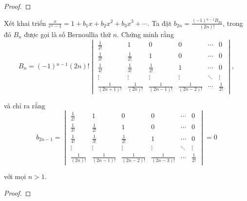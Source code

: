 \documentclass[class=linearalgebra,crop=false]{standalone}
\begin{document}
\begin{proof}
\end{proof}

\begin{exercise}
    \par Xét khai triển $\frac{x}{e^{x} - 1} = 1 + b_{1}x + b_{2}x^{2} + b_{3}x^{3} + \cdots$. Ta đặt $b_{2n} = \frac{(-1){}^{n-1}B_{2n}}{(2n)!}$, trong đó $B_{n}$ được gọi là số Bernoullia thứ $n$. Chứng minh rằng
    \[
        B_{n} = (-1){}^{n-1}(2n)!
        \begin{vmatrix}
            \frac{1}{2!}      & 1               & 0                 & 0                 & \cdots & 0            \\
            \frac{1}{3!}      & \frac{1}{2!}    & 1                 & 0                 & \cdots & 0            \\
            \frac{1}{4!}      & \frac{1}{3!}    & \frac{1}{2!}      & 1                 & \cdots & 0            \\
            \vdots            & \vdots          & \vdots            & \vdots            & \ddots & \vdots       \\
            \frac{1}{(2n+1)!} & \frac{1}{(2n)!} & \frac{1}{(2n-1)!} & \frac{1}{(2n-2)!} & \cdots & \frac{1}{2!}
        \end{vmatrix},
    \]
    \par và chỉ ra rằng
    \[
        b_{2n-1} =
        \begin{vmatrix}
            \frac{1}{2!}    & 1                 & 0                 & 0                 & \cdots & 0            \\
            \frac{1}{3!}    & \frac{1}{2!}      & 1                 & 0                 & \cdots & 0            \\
            \frac{1}{4!}    & \frac{1}{3!}      & \frac{1}{2!}      & 1                 & \cdots & 0            \\
            \vdots          & \vdots            & \vdots            & \vdots            & \ddots & \vdots       \\
            \frac{1}{(2n)!} & \frac{1}{(2n-1)!} & \frac{1}{(2n-2)!} & \frac{1}{(2n-3)!} & \cdots & \frac{1}{2!}
        \end{vmatrix}
        = 0
    \]
    \par với mọi $n > 1$.
\end{exercise}

\begin{proof}
\end{proof}
\end{document}

